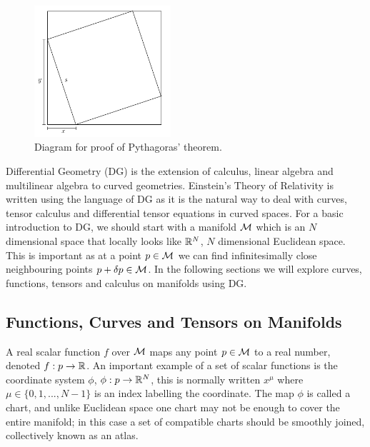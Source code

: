 \begin{figure}[h]
\centering
    \includegraphics[width=0.45\textwidth]{pics/pythag_proof2.png}
    \caption{Diagram for proof of Pythagoras' theorem.}
    \label{intro:fig:pythag_proof}
\end{figure}


Differential Geometry (DG) is the extension of calculus, linear algebra and multilinear algebra to curved
geometries. Einstein’s Theory of Relativity is written using the language of DG as it is the natural
way to deal with curves, tensor calculus and differential tensor equations in curved spaces. For a basic
introduction to DG, we should start with a manifold $\mathcal{M}$ which is an $N$ dimensional space that locally looks
like $\mathbb{R}^N$, $N$ dimensional Euclidean space. This is important as at a point $p\in\mathcal{M}$ we can find infinitesimally
close neighbouring points $p + \delta p \in \mathcal{M}$. In the following sections we will explore curves, functions, tensors and calculus on manifolds using DG.




\subsection{Functions, Curves and Tensors on Manifolds}
A real scalar function $f$ over $\mathcal{M}$ maps any point $p\in \mathcal{M}$ to a real number, denoted 
$f : p \rightarrow \mathbb{R}$. An important example of a set of scalar functions is the coordinate system $\phi$, $\phi : p \rightarrow \mathbb{R}^N$,
this is normally written $x^\mu$ where $\mu\in\{0,1,...,N-1\}$ is an index labelling the coordinate. The map $\phi$ is called a chart,
and unlike Euclidean space one chart may not be enough to cover the entire manifold; in this case a set
of compatible charts should be smoothly joined, collectively known as an atlas.


